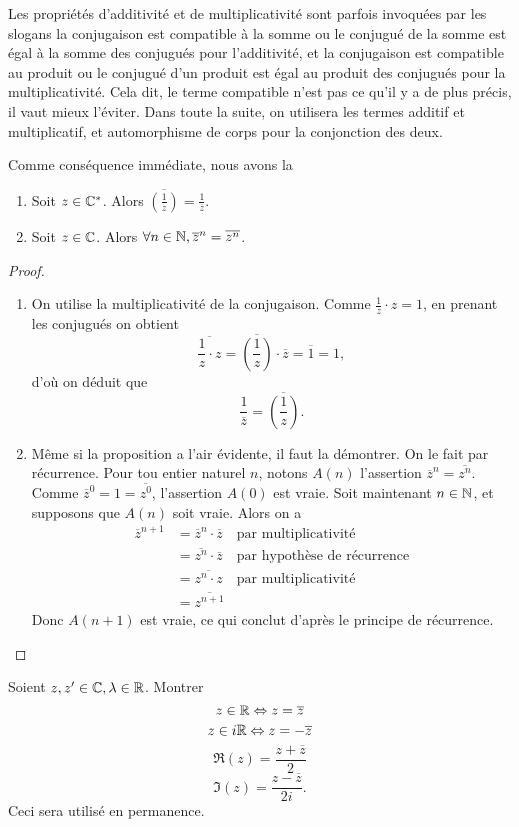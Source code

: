 \begin{remarque}
Les propriétés d'additivité et de multiplicativité sont parfois invoquées par les slogans \og la conjugaison est compatible à la somme\fg{} ou \og le conjugué de la somme est égal à la somme des conjugués\fg{} pour l'additivité, et \og la conjugaison est compatible au produit\fg{} ou \og le conjugué d'un produit est égal au produit des conjugués\fg{} pour la multiplicativité. Cela dit, le terme \og compatible\fg{} n'est pas ce qu'il y a de plus précis, il vaut mieux l'éviter. Dans toute la suite, on utilisera les termes \og additif\fg{} et \og multiplicatif\fg, et \og automorphisme de corps\fg{} pour la conjonction des deux.
\end{remarque}

Comme conséquence immédiate, nous avons la

\begin{proposition}
\begin{enumerate}
\item Soit $z\in\mathbb{C}^*$. Alors $\overline{\left(\frac{1}{z}\right)} = \frac{1}{\overline z}$.
\item Soit $z\in\mathbb{C}$. Alors $\forall n\in\mathbb{N}, \overline{z}^n = \overline{z^n}$.
\end{enumerate}
\end{proposition}

\begin{proof}
\begin{enumerate}
\item On utilise la multiplicativité de la conjugaison. Comme $\frac1z\cdot z=1$, en prenant les conjugués on obtient
\[ \overline{\frac1z\cdot z} = \overline{\left(\frac1z\right)}\cdot \overline{z} = \overline 1 = 1,\]
d'où on déduit que \[ \frac{1}{\overline z} = \overline{\left(\frac1z\right)}.\]
\item Même si la proposition a l'air évidente, il faut la démontrer. On le fait par récurrence. Pour tou entier naturel $n$, notons $A(n)$ l'assertion \og $\overline{z}^n = \overline{z^n}$\fg. Comme $\overline{z}^0=1=\overline{z^0}$, l'assertion $A(0)$ est vraie. Soit maintenant $n\in\mathbb{N}$, et supposons que $A(n)$ soit vraie. Alors on a 
\begin{align*}
\overline{z}^{n+1}
&=\overline{z}^{n}\cdot\overline{z} \quad \text{par multiplicativité}\\
&=\overline{z^n}\cdot \overline{z} \quad \text{par hypothèse de récurrence}\\
&=\overline{z^n\cdot z} \quad \text{par multiplicativité}\\
&=\overline{z^{n+1}}
\end{align*}
Donc $A(n+1)$ est vraie, ce qui conclut d'après le principe de récurrence.
\end{enumerate}
\end{proof}


\begin{exo}
Soient $z, z' \in \mathbb{C}, \lambda\in\mathbb{R}$. Montrer
\[z\in\mathbb{R} \Leftrightarrow z=\overline z\]
\[z\in i\mathbb{R} \Leftrightarrow z=-\overline{z}\]
\[\Re(z) = \frac{z+\overline z}{2}\]
\[\Im(z) = \frac{z-\overline z}{2i}.\]
Ceci sera utilisé en permanence.
\end{exo}
